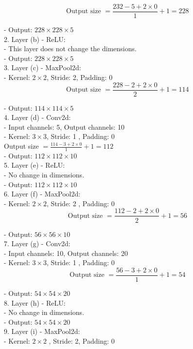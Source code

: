 \documentclass[12pt]{article}
\begin{document}
\begin{enumerate}
\begin{enumerate}
  \[
  \text { Output size }=\frac{232-5+2 \times 0}{1}+1=228
  \]
  
  - Output: \(228 \times 228 \times 5\)\\
  2. Layer (b) - ReLU:\\
  - This layer does not change the dimensions.\\
  - Output: \(228 \times 228 \times 5\)\\
  3. Layer (c) - MaxPool2d:\\
  - Kernel: \(2 \times 2\),  Stride: 2, Padding: 0\\
  
  \[
  \text { Output size }=\frac{228-2+2 \times 0}{2}+1=114
  \]
  
  - Output: \(114 \times 114 \times 5\)\\
  4. Layer (d) - Conv2d:\\
  - Input channels: 5, Output channels: 10\\
  - Kernel: \(3 \times 3\), Stride: 1 , Padding: 0\\
  Output size \(=\frac{114-3+2 \times 0}{1}+1=112\)\\
- Output: \(112 \times 112 \times 10\)\\
5. Layer (e) - ReLU:\\
- No change in dimensions.\\
- Output: \(112 \times 112 \times 10\)\\
6. Layer (f) - MaxPool2d:\\
- Kernel: \(2 \times 2\), Stride: 2 , Padding: 0\\

\[
\text { Output size }=\frac{112-2+2 \times 0}{2}+1=56
\]

- Output: \(56 \times 56 \times 10\)\\
7. Layer (g) - Conv2d:\\
- Input channels: 10, Output channels: 20\\
- Kernel: \(3 \times 3\), Stride: 1 , Padding: 0\\

\[
\text { Output size }=\frac{56-3+2 \times 0}{1}+1=54
\]

- Output: \(54 \times 54 \times 20\)\\
8. Layer (h) - ReLU:\\
- No change in dimensions.\\
- Output: \(54 \times 54 \times 20\)\\
9. Layer (i) - MaxPool2d:\\
- Kernel: \(2 \times 2\) , Stride: 2, Padding: 0\\


\end{enumerate}
\end{enumerate}
\end{document}
